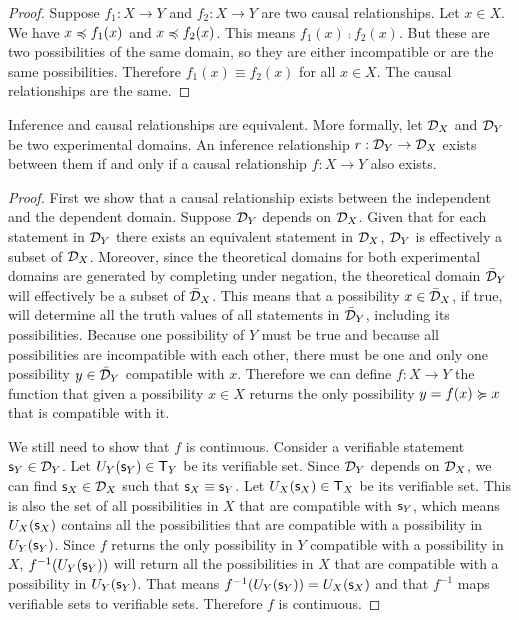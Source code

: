 \begin{mathSection}
\begin{coro}
	\end{coro}\label{pm-cd-causalRelationshipUniqueness}
	\begin{proof}
		Suppose $f_1 : X \to Y$ and $f_2 : X \to Y$ are two causal relationships. Let $x \in X$. We have $x \preccurlyeq f_1(x)$ and $x \preccurlyeq f_2(x)$. This means $f_1(x) \comp f_2(x)$. But these are two possibilities of the same domain, so they are either incompatible or are the same possibilities. Therefore $f_1(x) \equiv f_2(x)$ for all $x \in X$. The causal relationships are the same.
	\end{proof}
	\begin{thrm}\label{pm-cd-experimentalRelationshipTheorem}
		Inference and causal relationships are equivalent. More formally, let $\mathcal{D}_X$ and $\mathcal{D}_Y$ be two experimental domains. An inference relationship $r: \mathcal{D}_Y \to \mathcal{D}_X$ exists between them if and only if a causal relationship $f: X \to Y$ also exists.
	\end{thrm}
	\begin{proof}
		First we show that a causal relationship exists between the independent and the dependent domain. Suppose $\mathcal{D}_Y$ depends on $\mathcal{D}_X$. Given that for each statement in $\mathcal{D}_Y$ there exists an equivalent statement in $\mathcal{D}_X$, $\mathcal{D}_Y$ is effectively a subset of $\mathcal{D}_X$. Moreover, since the theoretical domains for both experimental domains are generated by completing under negation, the theoretical domain $\bar{\mathcal{D}}_Y$ will effectively be a subset of $\bar{\mathcal{D}}_X$. This means that a possibility $x \in \bar{\mathcal{D}}_X$, if true, will determine all the truth values of  all statements in $\bar{\mathcal{D}}_Y$, including its possibilities. Because one possibility of $Y$ must be true and because all possibilities are incompatible with each other, there must be one and only one possibility $y \in \bar{\mathcal{D}}_Y$ compatible with $x$. Therefore we can define $f : X \to Y$ the function that given a possibility $x \in X$ returns the only possibility $y=f(x) \succcurlyeq x$ that is compatible with it.
		
		We still need to show that $f$ is continuous. Consider a verifiable statement $\mathsf{s}_Y \in \mathcal{D}_Y$. Let $U_Y(\mathsf{s}_Y) \in \mathsf{T}_Y$ be its verifiable set. Since $\mathcal{D}_Y$ depends on $\mathcal{D}_X$, we can find $\mathsf{s}_X \in \mathcal{D}_X$ such that $\mathsf{s}_X \equiv \mathsf{s}_Y$. Let $U_X(\mathsf{s}_X) \in \mathsf{T}_X$ be its verifiable set. This is also the set of all possibilities in $X$ that are compatible with $\mathsf{s}_Y$, which means $U_X(\mathsf{s}_X)$ contains all the possibilities that are compatible with a possibility in $U_Y(\mathsf{s}_Y)$. Since $f$ returns the only possibility in $Y$ compatible with a possibility in $X$, $f^{-1}(U_Y(\mathsf{s}_Y))$ will return all the possibilities in $X$ that are compatible with a possibility in $U_Y(\mathsf{s}_Y)$. That means $f^{-1}(U_Y(\mathsf{s}_Y)) = U_X(\mathsf{s}_X)$ and that $f^{-1}$ maps verifiable sets to verifiable sets. Therefore $f$ is continuous.
		

\end{proof}
\end{mathSection}
